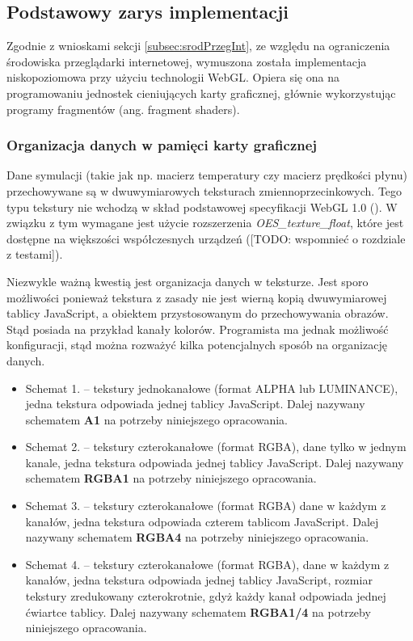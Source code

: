 \subsection{Podstawowy zarys implementacji}

Zgodnie z wnioskami sekcji \ref{subsec:srodPrzegInt}, ze względu na ograniczenia
środowiska przeglądarki internetowej, wymuszona została implementacja
niskopoziomowa przy użyciu technologii WebGL. Opiera się ona na programowaniu
jednostek cieniujących karty graficznej, głównie wykorzystując programy
fragmentów (ang. fragment shaders).

\subsubsection{Organizacja danych w pamięci karty graficznej}

Dane symulacji (takie jak np. macierz temperatury czy macierz prędkości płynu)
przechowywane są w dwuwymiarowych teksturach zmiennoprzecinkowych. Tego typu
tekstury nie wchodzą w skład podstawowej specyfikacji WebGL 1.0
(\cite{WebGLSpec}). W związku z tym wymagane jest użycie rozszerzenia
\emph{\mbox{OES\_texture\_float}}, które jest dostępne na większości
współczesnych urządzeń ([TODO: wspomnieć o rozdziale z testami]).

Niezwykle ważną kwestią jest organizacja danych w teksturze. Jest sporo
możliwości ponieważ tekstura z zasady nie jest wierną kopią dwuwymiarowej
tablicy JavaScript, a obiektem przystosowanym do przechowywania obrazów. Stąd
posiada na przykład kanały kolorów. Programista ma jednak możliwość
konfiguracji, stąd można rozważyć kilka potencjalnych sposób na organizację
danych.

\begin{itemize}

\item Schemat 1. -- tekstury jednokanałowe (format ALPHA lub LUMINANCE), jedna
tekstura odpowiada jednej tablicy JavaScript. Dalej nazywany schematem
\textbf{A1} na potrzeby niniejszego opracowania.

\item Schemat 2. -- tekstury czterokanałowe (format RGBA), dane tylko w jednym
kanale, jedna tekstura odpowiada jednej tablicy JavaScript. Dalej nazywany
schematem \textbf{RGBA1} na potrzeby niniejszego opracowania.

\item Schemat 3. -- tekstury czterokanałowe (format RGBA) dane w każdym z
kanałów, jedna tekstura odpowiada czterem tablicom JavaScript. Dalej nazywany
schematem \textbf{RGBA4} na potrzeby niniejszego opracowania.

\item Schemat 4. -- tekstury czterokanałowe (format RGBA), dane w każdym z
kanałów, jedna tekstura odpowiada jednej tablicy JavaScript, rozmiar tekstury
zredukowany czterokrotnie, gdyż każdy kanał odpowiada jednej ćwiartce tablicy.
Dalej nazywany schematem \textbf{RGBA1/4} na potrzeby niniejszego opracowania.

\end{itemize}


